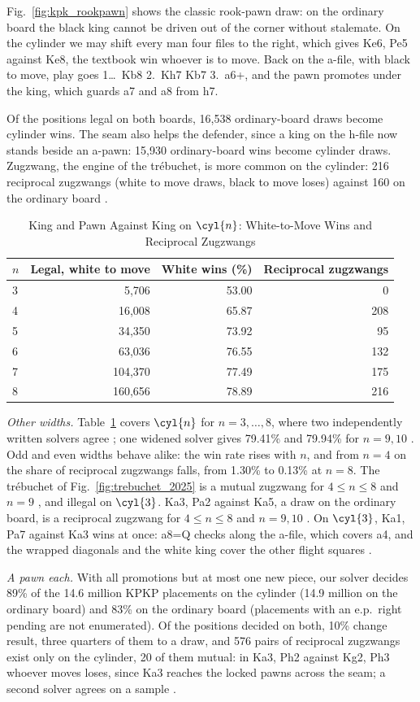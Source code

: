Fig.~\ref{fig:kpk_rookpawn} shows the classic rook-pawn draw: on the ordinary board the black king cannot be
driven out of the corner without stalemate. On the cylinder we may shift every man four files to the right,
which gives Ke6, Pe5 against Ke8, the textbook win whoever is to move. Back on the a-file, with black to move,
play goes 1\ldots~Kb8 2.~Kh7 Kb7 3.~a6+, and the pawn promotes under the king, which guards a7 and a8 from h7.

Of the positions legal on both boards, 16,538 ordinary-board draws become cylinder wins. The seam also
helps the defender, since a king on the h-file now stands beside an a-pawn: 15,930 ordinary-board wins
become cylinder draws. Zugzwang, the engine of the tr\'ebuchet, is more common on the cylinder: 216
reciprocal zugzwangs (white to move draws, black to move loses) against 160 on the ordinary board
.

\begin{table}[!htbp]
\centering
\caption{King and Pawn Against King on $\cyl{n}$: White-to-Move Wins and Reciprocal Zugzwangs }
\label{tab:oddw}
\footnotesize
\begin{tabular}{@{}lrrr@{}}
\toprule
$n$ & Legal, white to move & White wins (\%) & Reciprocal zugzwangs \\
\midrule
3 & 5,706   & 53.00 & 0   \\
4 & 16,008  & 65.87 & 208 \\
5 & 34,350  & 73.92 & 95  \\
6 & 63,036  & 76.55 & 132 \\
7 & 104,370 & 77.49 & 175 \\
8 & 160,656 & 78.89 & 216 \\
\bottomrule
\end{tabular}
\end{table}

\emph{Other widths.} Table~\ref{tab:oddw} covers $\cyl{n}$ for $n=3,\dots,8$, where two independently
written solvers agree ; one widened solver gives 79.41\% and 79.94\% for $n=9,10$ . Odd
and even widths behave alike: the win rate rises with $n$, and from $n=4$ on the share of reciprocal zugzwangs falls,
from 1.30\% to 0.13\% at $n=8$. The tr\'ebuchet of Fig.~\ref{fig:trebuchet_2025} is a mutual zugzwang for $4\le n\le8$  and $n=9$ , and illegal on $\cyl{3}$. Ka3, Pa2 against
Ka5, a draw on the ordinary board, is a reciprocal zugzwang for $4\le n\le8$  and $n=9,10$ . On $\cyl{3}$, Ka1, Pa7 against Ka3
wins at once: a8=Q checks along the a-file, which covers a4, and the wrapped diagonals and the white king cover
the other flight squares .

\emph{A pawn each.} With all promotions but at most one new piece, our solver decides 89\% of the 14.6 million
KPKP placements on the cylinder (14.9 million on the ordinary board) and 83\% on the ordinary board 
(placements with an e.p.\ right pending are not enumerated). Of the positions decided on both,
10\% change result, three quarters of them to a draw, and 576 pairs of reciprocal zugzwangs exist only on the
cylinder, 20 of them mutual: in Ka3, Ph2 against Kg2, Ph3 whoever moves loses, since Ka3 reaches the
locked pawns across the seam; a second solver agrees on a sample .
